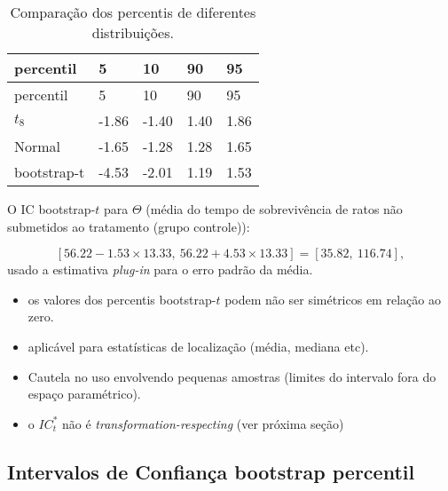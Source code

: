 \documentclass[
  letterpaper,
  DIV=11,
  numbers=noendperiod]{scrreprt}
\begin{document}
\begin{longtable}[]{@{}lllll@{}}
\caption{Comparação dos percentis de diferentes
distribuições.}\tabularnewline
\toprule\noalign{}
percentil & 5 & 10 & 90 & 95 \\
\midrule\noalign{}
\endfirsthead
\toprule\noalign{}
percentil & 5 & 10 & 90 & 95 \\
\midrule\noalign{}
\endhead
\bottomrule\noalign{}
\endlastfoot
\(t_8\) & -1.86 & -1.40 & 1.40 & 1.86 \\
Normal & -1.65 & -1.28 & 1.28 & 1.65 \\
bootstrap-t & -4.53 & -2.01 & 1.19 & 1.53 \\
\end{longtable}

O IC bootstrap-\(t\) para \(\Theta\) (média do tempo de sobrevivência de
ratos não submetidos ao tratamento (grupo controle)):

\[\left[ 56.22-1.53 \times 13.33, \ 56.22+4.53  \times 13.33\right]=\left[35.82, \ 116.74\right],\]
usado a estimativa \textit{plug-in} para o erro padrão da média.

\begin{tcolorbox}[enhanced jigsaw, coltitle=black, bottomtitle=1mm, toprule=.15mm, arc=.35mm, colframe=quarto-callout-tip-color-frame, breakable, opacityback=0, bottomrule=.15mm, rightrule=.15mm, titlerule=0mm, toptitle=1mm, title=\textcolor{quarto-callout-tip-color}{\faLightbulb}\hspace{0.5em}{Considerações Finais}, leftrule=.75mm, opacitybacktitle=0.6, left=2mm, colback=white, colbacktitle=quarto-callout-tip-color!10!white]

\begin{itemize}
\item
  os valores dos percentis bootstrap-\(t\) podem não ser simétricos em
  relação ao zero.
\item
  aplicável para estatísticas de localização (média, mediana etc).
\item
  Cautela no uso envolvendo pequenas amostras (limites do intervalo fora
  do espaço paramétrico).
\item
  o \(IC^*_t\) não é \emph{transformation-respecting} (ver próxima
  seção)
\end{itemize}

\end{tcolorbox}

\subsection{Intervalos de Confiança bootstrap
percentil}\label{intervalos-de-confianuxe7a-bootstrap-percentil}
\end{document}
